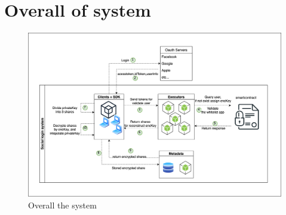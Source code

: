 \documentclass[../Main.tex]{subfiles}
\begin{document}
\section{Overall of system}
\begin{figure}[H]
 \centering
 \includegraphics[scale=0.1]{Figure/OverallSocialLoginSystem.png}
    \caption{Overall the system}
    \label{fig:OverallSystem}
\end{figure}
\end{document}
